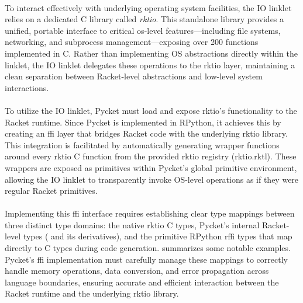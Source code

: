 				\paragraph{}%
					To interact effectively with underlying operating system facilities, the IO linklet relies on a dedicated C library called \emph{rktio}. This standalone library provides a unified, portable interface to critical \gls{os}-level features—including file systems, networking, and subprocess management—exposing over 200 functions implemented in C. Rather than implementing OS abstractions directly within the linklet, the IO linklet delegates these operations to the rktio layer, maintaining a clean separation between Racket-level abstractions and low-level system interactions.

				\paragraph{}%
					To utilize the IO linklet, Pycket must load and expose rktio’s functionality to the Racket runtime. Since Pycket is implemented in RPython, it achieves this by creating an \gls{ffi} layer that bridges Racket code with the underlying rktio library. This integration is facilitated by automatically generating wrapper functions around every rktio C function from the provided rktio registry (rktio.rktl). These wrappers are exposed as primitives within Pycket’s global primitive environment, allowing the IO linklet to transparently invoke OS-level operations as if they were regular Racket primitives.

				\paragraph{}%
					Implementing this \gls{ffi} interface requires establishing clear type mappings between three distinct type domains: the native rktio C types, Pycket’s internal Racket-level types ( and its derivatives), and the primitive RPython rffi types that map directly to C types during code generation.  summarizes some notable examples. Pycket’s \gls{ffi} implementation must carefully manage these mappings to correctly handle memory operations, data conversion, and error propagation across language boundaries, ensuring accurate and efficient interaction between the Racket runtime and the underlying rktio library.


